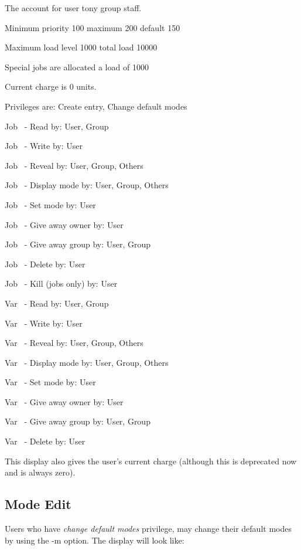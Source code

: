 \begin{exparasmall}

The \manualProduct{} account for user tony group staff.

Minimum priority 100 maximum 200 default 150

Maximum load level 1000 total load 10000

Special jobs are allocated a load of 1000

Current charge is 0 units.

Privileges are: Create entry, Change default modes

Job \ {}- Read by: User, Group

Job \ {}- Write by: User

Job \ {}- Reveal by: User, Group, Others

Job \ {}- Display mode by: User, Group, Others

Job \ {}- Set mode by: User

Job \ {}- Give away owner by: User

Job \ {}- Give away group by: User, Group

Job \ {}- Delete by: User

Job \ {}- Kill (jobs only) by: User

Var \ {}- Read by: User, Group

Var \ {}- Write by: User

Var \ {}- Reveal by: User, Group, Others

Var \ {}- Display mode by: User, Group, Others

Var \ {}- Set mode by: User

Var \ {}- Give away owner by: User

Var \ {}- Give away group by: User, Group

Var \ {}- Delete by: User

\end{exparasmall}

This display also gives the user's current charge (although this is deprecated now and is always zero).

\subsection{Mode Edit}
Users who have \textit{change default modes} privilege, may change their default modes by using the -m option. The \PrBtuser{}
 display will look like:

